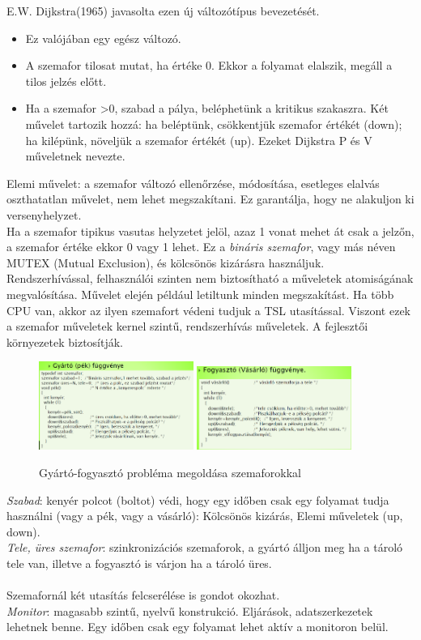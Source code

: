 \documentclass[margin=0px]{article}
\begin{document}
	E.W. Dijkstra(1965) javasolta ezen új változótípus bevezetését.
	\begin{itemize}
		\item Ez valójában egy egész változó.
		\item A szemafor tilosat mutat, ha értéke 0. Ekkor a folyamat elalszik, megáll a tilos jelzés előtt.
		\item Ha a szemafor >0, szabad a pálya, beléphetünk a kritikus szakaszra. Két művelet tartozik hozzá: ha beléptünk, csökkentjük szemafor értékét (down); ha kilépünk, növeljük a szemafor értékét (up). Ezeket Dijkstra P és V műveletnek nevezte.
	\end{itemize} 
	Elemi művelet: a szemafor változó ellenőrzése, módosítása, esetleges elalvás oszthatatlan művelet, nem lehet megszakítani. Ez garantálja, hogy ne alakuljon ki versenyhelyzet. \\
	Ha a szemafor tipikus vasutas helyzetet jelöl, azaz 1 vonat mehet át csak a jelzőn, a szemafor értéke ekkor 0 vagy 1 lehet. Ez a \textit{bináris szemafor}, vagy más néven MUTEX (Mutual Exclusion), és kölcsönös kizárásra használjuk. \\
	Rendszerhívással, felhasználói szinten nem biztosítható a műveletek atomiságának megvalósítása. Művelet elején például letiltunk minden megszakítást. Ha több CPU van, akkor az ilyen szemafort védeni tudjuk a TSL utasítással. Viszont ezek a szemafor műveletek kernel szintű, rendszerhívás műveletek. A fejlesztői környezetek biztosítják.
	\begin{figure}[H]
		\centering
		\includegraphics[width=0.45\textwidth]{img/gyarto_szemafor.png}
		\includegraphics[width=0.45\textwidth]{img/fogyaszto_szemafor.png}
		\caption{Gyártó-fogyasztó probléma megoldása szemaforokkal}
	\end{figure}
	\textit{Szabad}: kenyér polcot (boltot) védi, hogy egy időben csak egy folyamat tudja használni (vagy a pék, vagy a vásárló): Kölcsönös kizárás, Elemi műveletek (up, down). \\
	\textit{Tele, üres szemafor}: szinkronizációs szemaforok, a gyártó álljon meg ha a tároló tele van, illetve a fogyasztó is várjon ha a tároló üres. \\ \\
	Szemafornál két utasítás felcserélése is gondot okozhat. \\
	\textit{Monitor}: magasabb szintű, nyelvű konstrukció. Eljárások, adatszerkezetek
	lehetnek benne. Egy időben csak egy folyamat lehet aktív a monitoron belül.
	
\end{document}
